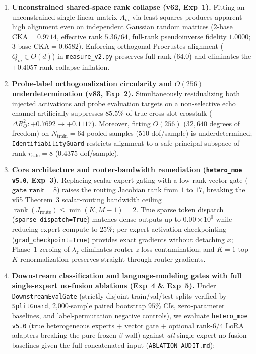 \documentclass[10pt,twoside]{article}
\theoremstyle{definition}
\theoremstyle{plain}
\theoremstyle{remark}
\begin{document}
\begin{enumerate}[leftmargin=1.6em, itemsep=1pt, parsep=0pt]
    \item \textbf{Unconstrained shared-space rank collapse (v62, Exp~1).} Fitting an unconstrained single linear matrix $A_m$ via least squares produces apparent high alignment even on independent Gaussian random matrices ($2$-base $\mathrm{CKA}=0.9714$, effective rank $5.36/64$, full-rank pseudoinverse fidelity $1.0000$; $3$-base $\mathrm{CKA}=0.6582$). Enforcing orthogonal Procrustes alignment ($Q_m \in O(d)$) in \texttt{measure\_v2.py} preserves full rank ($64.0$) and eliminates the $+0.4057$ rank-collapse inflation.
    \item \textbf{Probe-label orthogonalization circularity and $O(256)$ underdetermination (v83, Exp~2).} Simultaneously residualizing both injected activations and probe evaluation targets on a non-selective echo channel artificially suppresses $85.5\%$ of true cross-slot crosstalk ($\Delta R^2_O: +0.7692 \to +0.1117$). Moreover, fitting $O(256)$ ($32{,}640$ degrees of freedom) on $N_{\text{train}}{=}64$ pooled samples ($510$ dof/sample) is underdetermined; \texttt{IdentifiabilityGuard} restricts alignment to a safe principal subspace of rank $r_{\text{safe}}{=}8$ ($0.4375$ dof/sample).
    \item \textbf{Core architecture and router-bandwidth remediation (\texttt{hetero\_moe v5.0}, Exp~3).} Replacing scalar expert gating with a low-rank vector gate ($\texttt{gate\_rank}=8$) raises the routing Jacobian rank from $1$ to $17$, breaking the v55 Theorem~3 scalar-routing bandwidth ceiling $\operatorname{rank}(J_{\text{route}}) \le \min(K, M-1)=2$. True sparse token dispatch (\texttt{sparse\_dispatch=True}) matches dense outputs up to $0.00\times 10^0$ while reducing expert compute to $25\%$; per-expert activation checkpointing (\texttt{grad\_checkpoint=True}) provides exact gradients without detaching $x$; Phase~1 zeroing of $\lambda_z$ eliminates router $z$-loss contamination; and $K{=}1$ top-$K$ renormalization preserves straight-through router gradients.
    \item \textbf{Downstream classification and language-modeling gates with full single-expert no-fusion ablations (Exp~4 \& Exp~5).} Under \texttt{DownstreamEvalGate} (strictly disjoint train/val/test splits verified by \texttt{SplitGuard}, 2{,}000-sample paired bootstrap $95\%$ CIs, zero-parameter baselines, and label-permutation negative controls), we evaluate \texttt{hetero\_moe v5.0} (true heterogeneous experts + vector gate + optional rank-$6$/$4$ LoRA adapters breaking the pure-frozen $\beta$ wall) against \emph{all} single-expert no-fusion baselines given the full concatenated input (\texttt{ABLATION\_AUDIT.md}):

\end{enumerate}
\end{document}
